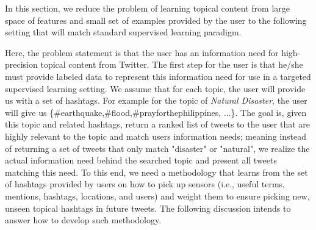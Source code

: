 In this section, we reduce the problem of learning topical content from large space of features and small set of examples provided by the user to the following setting that will match standard supervised learning paradigm.

Here, the problem statement is that the user has an information need for high-precision topical content from Twitter. 
The first step for the user is that he/she must provide labeled data to represent this information need for use in a targeted supervised learning setting.
 We assume that for each topic, the user will provide us with a set of hashtags. For example for the topic of \textit{Natural Disaster}, 
the user will give us \{\#earthquake,\#flood,\#prayforthephilippines, ...\}. The goal is, given this topic and related hashtags, return a ranked
 list of tweets to the user that are highly relevant to the topic and match users information needs; meaning instead of returning a set of tweets
 that only match "disaster" or "natural", we realize the actual information need behind the searched topic and present all tweets matching this need. 
To this end, we need a methodology that learns from the set of hashtags provided by users on how to pick up sensors (i.e., useful terms, mentions, 
hashtags, locations, and users) and weight them to ensure picking new, unseen topical hashtags in future tweets. The following discussion intends
 to answer how to develop such methodology. %

